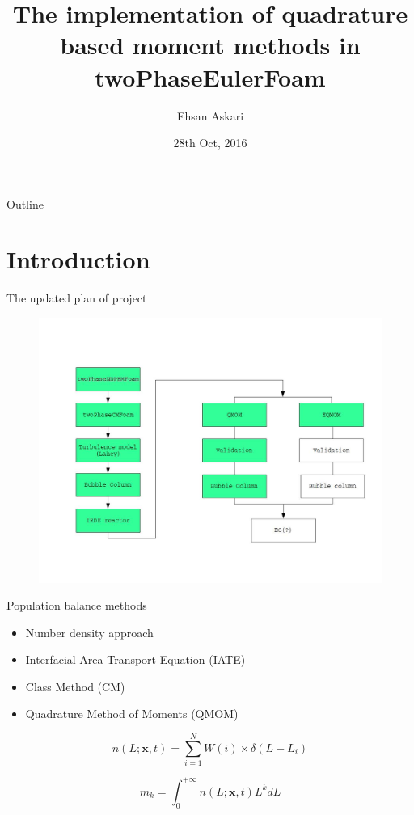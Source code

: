 \documentclass{beamer}
\title[twoPhasePBMFoam]{The implementation of quadrature based moment methods in twoPhaseEulerFoam}
\author[Ehsan Askari]{Ehsan Askari}
\date{28th Oct, 2016}
\begin{document}
\begin{frame}
  \titlepage
\end{frame}

\begin{frame}{Outline}
  \tableofcontents
\end{frame}

\section{Introduction}

\begin{frame}{The updated plan of project}

  \begin{figure}
  \includegraphics[width=0.9\linewidth]{plan.jpg}
  \end{figure} 

\end{frame}

\begin{frame}{Population balance methods}

\begin{itemize}
\item Number density approach
\item Interfacial Area Transport Equation (IATE)
\item Class Method (CM)
\item Quadrature Method of Moments (QMOM) 


\end{itemize}


\begin{equation*}
n(L;\textbf{x},t)=\sum_{i=1}^{N}W(i)\times \delta(L-L_i)
\end{equation*}

\begin{equation*}
m_k=\int_{0}^{+\infty}n(L;\textbf{x},t)L^kdL
\end{equation*}


\end{frame}
\end{document}
